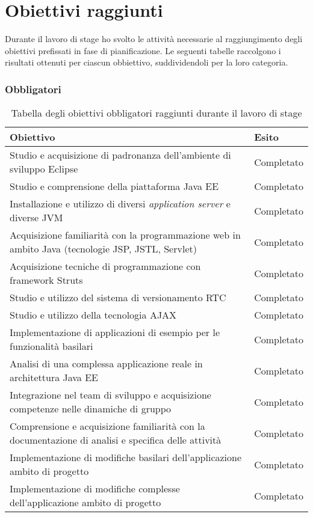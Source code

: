 \section{Obiettivi raggiunti}

Durante il lavoro di stage ho svolto le attività necessarie al raggiungimento degli obiettivi prefissati in fase di pianificazione.
Le seguenti tabelle raccolgono i risultati ottenuti per ciascun obbiettivo, suddividendoli per la loro categoria.

\subsubsection{Obbligatori}

	\begin{table}[H]
		\def\arraystretch{1.2}
		\begin{tabular}{ | p{10cm} | p{2cm} | }
		
		\rowcolor{Gray}
		\hline \textbf{Obiettivo} & \textbf{Esito} \\ \hline
		
		Studio e acquisizione di padronanza dell'ambiente di sviluppo Eclipse & Completato \\ \hline
		Studio e comprensione della piattaforma Java EE & Completato \\ \hline
		Installazione e utilizzo di diversi \textit{application server} e diverse JVM & Completato \\ \hline
		Acquisizione familiarità con la programmazione web in ambito Java (tecnologie JSP, JSTL, Servlet\glossario ) & Completato \\ \hline
		Acquisizione tecniche di programmazione con framework Struts & Completato \\ \hline
		Studio e utilizzo del sistema di versionamento RTC & Completato \\ \hline
		Studio e utilizzo della tecnologia AJAX\glossario & Completato \\ \hline
		Implementazione di applicazioni di esempio per le funzionalità basilari & Completato \\ \hline
		Analisi di una complessa applicazione reale in architettura Java EE & Completato \\ \hline
		Integrazione nel team di sviluppo e acquisizione competenze nelle dinamiche di gruppo & Completato \\ \hline
		Comprensione e acquisizione familiarità con la documentazione di analisi e specifica delle attività & Completato \\ \hline
		Implementazione di modifiche basilari dell'applicazione ambito di progetto & Completato \\ \hline
		Implementazione di modifiche complesse dell'applicazione ambito di progetto & Completato \\ \hline
		
		\end{tabular}
		\vspace{1mm}
		\caption{Tabella degli obiettivi obbligatori raggiunti durante il lavoro di stage}
	\end{table}


